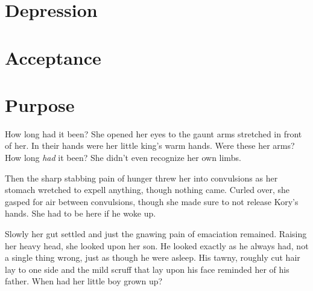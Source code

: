 \documentclass[9pt]{memoir}
\begin{document}
\chapter*{Depression}



\chapter*{Acceptance}



\chapter*{Purpose}

How long had it been? She opened her eyes to the gaunt arms stretched in front of her. In their hands were her little king's warm hands. Were these her arms? How long \textit{had} it been? She didn't even recognize her own limbs.

Then the sharp stabbing pain of hunger threw her into convulsions as her stomach wretched to expell anything, though nothing came. Curled over, she gasped for air between convulsions, though she made sure to not release Kory's hands. She had to be here if he woke up.

Slowly her gut settled and just the gnawing pain of emaciation remained. Raising her heavy head, she looked upon her son. He looked exactly as he always had, not a single thing wrong, just as though he were asleep. His tawny, roughly cut hair lay to one side and the mild scruff that lay upon his face reminded her of his father. When had her little boy grown up?


\backmatter
\end{document}
